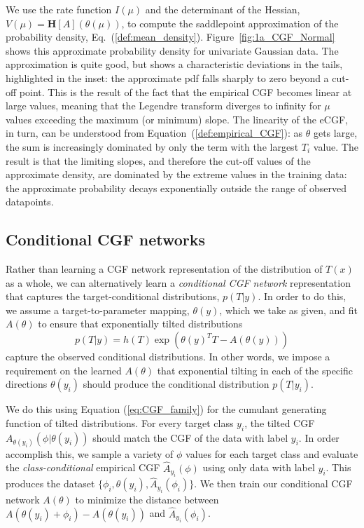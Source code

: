 \documentclass{article}      %
\begin{document}
We use the rate function $I(\mu)$ and the determinant of the Hessian, ${V(\mu) = \bm{H}[A](\theta(\mu))}$, to compute the saddlepoint approximation of the probability density, Eq.~(\ref{def:mean_density}).
Figure~\ref{fig:1a_CGF_Normal} shows this approximate probability density for univariate Gaussian data.
The approximation is quite good, but shows a characteristic deviations in the tails, highlighted in the inset:
the approximate pdf falls sharply to zero beyond a cut-off point. 
This is the result of the fact that the empirical CGF becomes linear at large values, meaning that the Legendre transform diverges to infinity for $\mu$ values exceeding the maximum (or minimum) slope.
The linearity of the eCGF, in turn, can be understood from Equation~(\ref{def:empirical_CGF}): as $\theta$ gets large, the sum is increasingly dominated by only the term with the largest $T_i$ value.
The result is that the limiting slopes, and therefore the cut-off values of the approximate density, are dominated by the extreme values in the training data: the approximate probability decays exponentially outside the range of observed datapoints.



\subsection{Conditional CGF networks}

Rather than learning a CGF network representation of the distribution of $T(x)$ as a whole, we can alternatively learn a \textit{conditional CGF network} representation that captures the target-conditional distributions, $p(T|y)$.
In order to do this, we assume a target-to-parameter mapping, $\theta(y)$, which we take as given, and fit $A(\theta)$ to ensure that exponentially tilted distributions
\begin{equation}
  p(T|y) = h(T) \exp(\theta(y)^T T - A(\theta(y))) \label{eq:class_conditional}
\end{equation}
capture the observed conditional distributions.
In other words, we impose a requirement on the learned $A(\theta)$ that exponential tilting in each of the specific directions $\theta(y_i)$ should produce the conditional distribution $p(T|y_i)$.

We do this using Equation (\ref{eq:CGF_family}) for the cumulant generating function of tilted distributions.
For every target class $y_i$, the tilted CGF $A_{\theta(y_i)}(\phi | \theta(y_i))$ should match the CGF of the data with label $y_i$.
In order accomplish this, we sample a variety of $\phi$ values for each target class and evaluate the \textit{class-conditional} empirical CGF $\hat A_{y_i}(\phi)$ using only data with label $y_i$.
This produces the dataset $\{\phi_{i}, \theta(y_i), \hat A_{y_i}(\phi_i)\}$.
We then train our conditional CGF network $A(\theta)$ to minimize the distance between ${A(\theta(y_i) + \phi_i ) - A(\theta(y_i))}$ and $\hat A_{y_i}(\phi_i)$.
\end{document}
